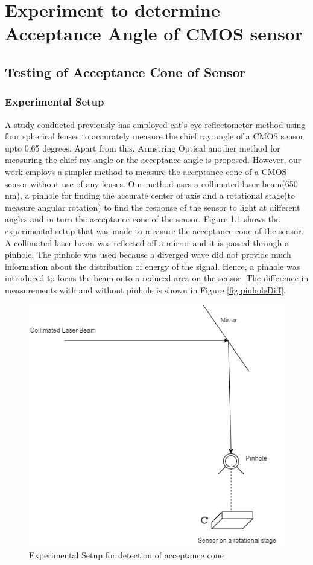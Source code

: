 \chapter{Experiment to determine Acceptance Angle of CMOS sensor}
\label{chp:Experiment_FOV}
\section{Testing of Acceptance Cone of Sensor}
\subsection{Experimental Setup}
A study conducted previously\cite{cra2} has employed cat's eye reflectometer method using four spherical lenses to accurately measure the chief ray angle of a CMOS sensor upto 0.65 degrees\cite{cra2}. Apart from this, Armstring Optical another method for measuring the chief ray angle or the acceptance angle\cite{cra1} is proposed. However, our work employs a simpler method to measure the acceptance cone of a CMOS sensor without use of any lenses. Our method uses a collimated laser beam(650 nm), a pinhole for finding the accurate center of axis and a rotational stage(to measure angular rotation) to find the response of the sensor to light at different angles and in-turn the acceptance cone of the sensor. 
Figure \ref{fig:exp_acc} shows the experimental setup that was made to measure the acceptance cone of the sensor. A collimated laser beam was reflected off a mirror and it is passed through a pinhole. The pinhole was used because a diverged wave did not provide much information about the distribution of energy of the signal. Hence, a pinhole was introduced to focus the beam onto a reduced area on the sensor. The difference in measurements with and without pinhole is shown in Figure \ref{fig:pinholeDiff}.
 \begin{figure}[ht]
\centering
\includegraphics[scale=0.50]{pics/acceptanceCone.png}
\caption{Experimental Setup for detection of acceptance cone}
\label{fig:exp_acc}
\end{figure}

